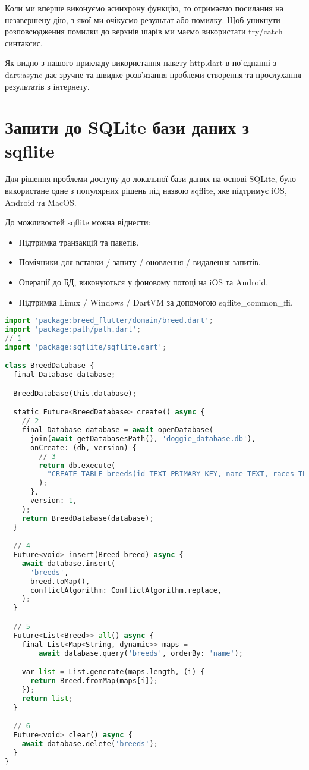 Коли ми вперше виконуємо асинхрону функцію, то отримаємо посилання на незавершену дію, з якої ми очікуємо результат або помилку.
Щоб уникнути розповсюдження помилки до верхнів шарів ми маємо використати try/catch синтаксис.

Як видно з нашого прикладу використання пакету http.dart в по'єднанні з dart:async дає зручне та швидке розв'язання проблеми створення та прослухання результатів з інтернету.


\section{Запити до SQLite бази даних з sqflite}
\label{section.3.4}
Для рішення проблеми доступу до локальної бази даних на основі SQLite,
було використане одне з популярних рішень під назвою sqflite, яке підтримує iOS, Android та MacOS.

До можливостей sqflite можна віднести:

\begin{itemize}
    \item Підтримка транзакцій та пакетів.
    \item Помічники для вставки / запиту / оновлення / видалення запитів.
    \item Операції до БД, виконуються у фоновому потоці на iOS та Android.
    \item Підтримка Linux / Windows / DartVM за допомогою sqflite_common_ffi.
\end{itemize}

\begin{lstlisting}[style=light, language=Python,label={lst:flutter_sqflite},caption=Flutter SQFLITE]
import 'package:breed_flutter/domain/breed.dart';
import 'package:path/path.dart';
// 1
import 'package:sqflite/sqflite.dart';

class BreedDatabase {
  final Database database;

  BreedDatabase(this.database);

  static Future<BreedDatabase> create() async {
    // 2
    final Database database = await openDatabase(
      join(await getDatabasesPath(), 'doggie_database.db'),
      onCreate: (db, version) {
        // 3
        return db.execute(
          "CREATE TABLE breeds(id TEXT PRIMARY KEY, name TEXT, races TEXT, isFavorite INTEGER)",
        );
      },
      version: 1,
    );
    return BreedDatabase(database);
  }

  // 4
  Future<void> insert(Breed breed) async {
    await database.insert(
      'breeds',
      breed.toMap(),
      conflictAlgorithm: ConflictAlgorithm.replace,
    );
  }

  // 5
  Future<List<Breed>> all() async {
    final List<Map<String, dynamic>> maps =
        await database.query('breeds', orderBy: 'name');

    var list = List.generate(maps.length, (i) {
      return Breed.fromMap(maps[i]);
    });
    return list;
  }

  // 6
  Future<void> clear() async {
    await database.delete('breeds');
  }
}
\end{lstlisting}

